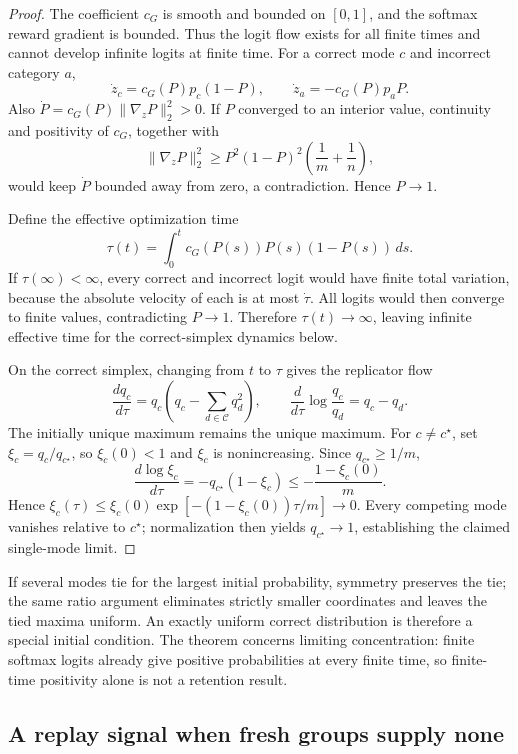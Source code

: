 \documentclass{article}
\newcommand{\1}{\mathbf 1}
\theoremstyle{remark}
\theoremstyle{definition}
\theoremstyle{plain}
\begin{document}
\begin{proof}
The coefficient $c_G$ is smooth and bounded on $[0,1]$, and the softmax
reward gradient is bounded. Thus the logit flow exists for all finite times
and cannot develop infinite logits at finite time.
For a correct mode $c$ and incorrect category $a$,
\[
  \dot z_c=c_G(P)p_c(1-P),
  \qquad
  \dot z_a=-c_G(P)p_aP.
\]
Also $\dot P=c_G(P)\lVert\nabla_zP\rVert_2^2>0$. If $P$ converged to an
interior value, continuity and positivity of $c_G$, together with
\[
 \lVert\nabla_zP\rVert_2^2
 \ge P^2(1-P)^2\left(\frac1m+\frac1n\right),
\]
would keep $\dot P$ bounded away from zero, a contradiction. Hence $P\to1$.

Define the effective optimization time
\[
  \tau(t)=\int_0^t c_G(P(s))P(s)(1-P(s))\,ds.
\]
If $\tau(\infty)<\infty$, every correct and incorrect logit would have finite
total variation, because the absolute velocity of each is at most $\dot\tau$.
All logits would then converge to finite values, contradicting $P\to1$.
Therefore $\tau(t)\to\infty$, leaving infinite effective time for the
correct-simplex dynamics below.

On the correct simplex, changing from $t$ to $\tau$ gives the replicator flow
\begin{equation}
  \frac{dq_c}{d\tau}
  =q_c\left(q_c-\sum_{d\in\mathcal C}q_d^2\right),
  \qquad
  \frac{d}{d\tau}\log\frac{q_c}{q_d}=q_c-q_d.
  \label{eq:grpo-replicator}
\end{equation}
The initially unique maximum remains the unique maximum. For $c\ne c^\star$,
set $\xi_c=q_c/q_{c^\star}$, so $\xi_c(0)<1$ and $\xi_c$ is nonincreasing.
Since $q_{c^\star}\ge1/m$,
\[
 \frac{d\log\xi_c}{d\tau}
 =-q_{c^\star}(1-\xi_c)
 \le-\frac{1-\xi_c(0)}{m}.
\]
Hence $\xi_c(\tau)\le\xi_c(0)\exp[-(1-\xi_c(0))\tau/m]\to0$.
Every competing mode vanishes relative to $c^\star$; normalization then
yields $q_{c^\star}\to1$, establishing the claimed single-mode limit.
\end{proof}

If several modes tie for the largest initial probability, symmetry preserves
the tie; the same ratio argument eliminates strictly smaller coordinates and
leaves the tied maxima uniform. An exactly uniform correct distribution is
therefore a special initial condition. The theorem concerns limiting
concentration: finite softmax logits already give positive probabilities at
every finite time, so finite-time positivity alone is not a retention result.

\subsection{A replay signal when fresh groups supply none}
\label{app:theory-gradient-availability}
\end{document}
